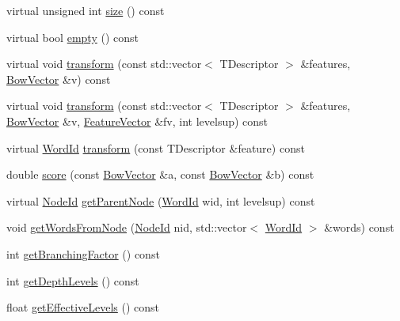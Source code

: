 \begin{DoxyCompactItemize}
\item 
virtual unsigned int \hyperlink{classDBoW2_1_1TemplatedVocabulary_a3907da675f135821894fb497f113ccb0}{size} () const 
\item 
virtual bool \hyperlink{classDBoW2_1_1TemplatedVocabulary_ac897310f6a3475da1c0f0ef118b337d1}{empty} () const 
\item 
virtual void \hyperlink{classDBoW2_1_1TemplatedVocabulary_af9fc1935403dcaf1fd8c44d96ae3328d}{transform} (const std\-::vector$<$ T\-Descriptor $>$ \&features, \hyperlink{classDBoW2_1_1BowVector}{Bow\-Vector} \&v) const 
\item 
virtual void \hyperlink{classDBoW2_1_1TemplatedVocabulary_acae97a5b78d9850a627d45cb05969041}{transform} (const std\-::vector$<$ T\-Descriptor $>$ \&features, \hyperlink{classDBoW2_1_1BowVector}{Bow\-Vector} \&v, \hyperlink{classDBoW2_1_1FeatureVector}{Feature\-Vector} \&fv, int levelsup) const 
\item 
virtual \hyperlink{namespaceDBoW2_ab1a0d3283b2d4690a383372ed20bfeb5}{Word\-Id} \hyperlink{classDBoW2_1_1TemplatedVocabulary_a7bdb12ed8de8e2da937dd0c6de96a53a}{transform} (const T\-Descriptor \&feature) const 
\item 
double \hyperlink{classDBoW2_1_1TemplatedVocabulary_a4988c1ab067de25259115bf9963b02d9}{score} (const \hyperlink{classDBoW2_1_1BowVector}{Bow\-Vector} \&a, const \hyperlink{classDBoW2_1_1BowVector}{Bow\-Vector} \&b) const 
\item 
virtual \hyperlink{namespaceDBoW2_a3a0fa9c50c0df508759362d6204566f2}{Node\-Id} \hyperlink{classDBoW2_1_1TemplatedVocabulary_aa59e9b47d05bce5ecd4e90afbcd63727}{get\-Parent\-Node} (\hyperlink{namespaceDBoW2_ab1a0d3283b2d4690a383372ed20bfeb5}{Word\-Id} wid, int levelsup) const 
\item 
void \hyperlink{classDBoW2_1_1TemplatedVocabulary_a916015cc8e6cd6f53c6e067c7b829f75}{get\-Words\-From\-Node} (\hyperlink{namespaceDBoW2_a3a0fa9c50c0df508759362d6204566f2}{Node\-Id} nid, std\-::vector$<$ \hyperlink{namespaceDBoW2_ab1a0d3283b2d4690a383372ed20bfeb5}{Word\-Id} $>$ \&words) const 
\item 
int \hyperlink{classDBoW2_1_1TemplatedVocabulary_afadb7942a23548903deb4548ca1d6e7d}{get\-Branching\-Factor} () const 
\item 
int \hyperlink{classDBoW2_1_1TemplatedVocabulary_a60d5e4d240d69042c47473d4c6497e01}{get\-Depth\-Levels} () const 
\item 
float \hyperlink{classDBoW2_1_1TemplatedVocabulary_acee6fb9313d844fbcf05f470379c6dc3}{get\-Effective\-Levels} () const 

\end{DoxyCompactItemize}
